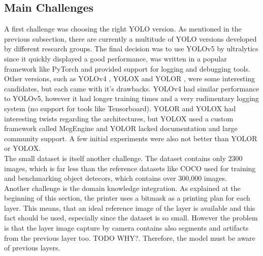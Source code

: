 \subsection{Main Challenges}
A first challenge was choosing the right YOLO version. As mentioned in the previous subsection, there are currently a multitude of YOLO versions developed by different research groups. The final decision was to use YOLOv5 by ultralytics \cite{yolov5_git} since it quickly displayed a good performance, was written in a popular framework like PyTorch and provided support for logging and debugging tools. Other versions, such as YOLOv4 \cite{yolov4_paper}, YOLOX \cite{yolox_paper} and YOLOR \cite{yolor_paper}, were some interesting candidates, but each came with it's drawbacks. YOLOv4 had similar performance to YOLOv5, however it had longer training times and a very rudimentary logging system (no support for tools like Tensorboard). YOLOR and YOLOX had interesting twists regarding the architectures, but YOLOX used a custom framework called MegEngine \cite{megengine_git} and YOLOR lacked documentation and large community support. A few initial experiments were also not better than YOLOR or YOLOX. \\
The small dataset is itself another challenge. The dataset contains only 2300 images, which is far less than the reference datasets like COCO \cite{coco_site} used for training and benchmarking object detecors, which contains over 300,000 images. \\
Another challenge is the domain knowledge integration. As explained at the beginning of this section, the printer uses a bitmask as a printing plan for each layer. This means, that an ideal reference image of the layer is available and this fact should be used, especially since the dataset is so small. However the problem is that the layer image capture by camera contains also segments and artifacts from the previous layer too. TODO WHY?. Therefore, the model must be aware of previous layers. \\


